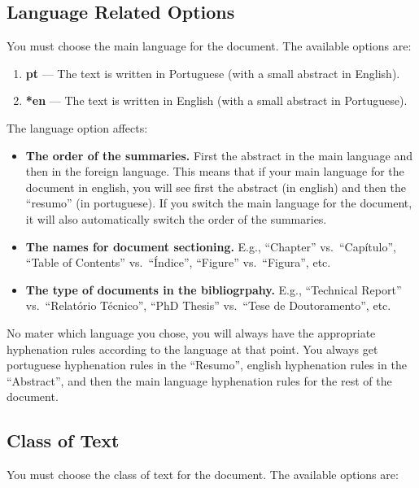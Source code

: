 \subsection{Language Related Options} %
\label{sub:language_related_options}

You must choose the main language for the document. The available options are:

\begin{enumerate}
	\item \textbf{pt} --- The text is written in Portuguese (with a small abstract in English).
	\item \textbf{*en} --- The text is written in English (with a small abstract in Portuguese).
\end{enumerate}

The language option affects:
\begin{itemize}
	\item \textbf{The order of the summaries.} First the abstract in the main language and then in the foreign language. This means that if your main language for the document in english, you will see first the abstract (in english) and then the ``resumo'' (in portuguese). If you switch the main language for the document, it will also automatically switch the order of the summaries.
	\item \textbf{The names for document sectioning.} E.g., ``Chapter'' vs.\ ``Capítulo'', ``Table of Contents'' vs.\ ``Índice'', ``Figure'' vs.\ ``Figura'', etc.
	\item \textbf{The type of documents in the bibliogrpahy.} E.g., ``Technical Report'' vs.\ ``Relatório Técnico'', ``PhD Thesis'' vs.\ ``Tese de Doutoramento'', etc.
\end{itemize} 

No mater which language you chose, you will always have the appropriate hyphenation rules according to the language at that point. You always get portuguese hyphenation rules in the ``Resumo'', english hyphenation rules in the ``Abstract'', and then the main language hyphenation rules for the rest of the document.

\subsection{Class of Text} %
\label{sub:class_of_text}

You must choose the class of text for the document. The available options are:

